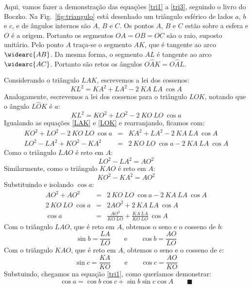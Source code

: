 Aqui, vamos fazer a demonstração das equações \ref{tri1} a \ref{tri3}, seguindo o livro do Boczko. Na Fig.~\ref{fig:triangulo} está desenhado um triângulo esférico de lados $a$, $b$ e $c$, e de ângulos internos são $A$, $B$ e $C$. Os pontos $A$, $B$ e $C$ estão sobre a esfera e $O$ é a origem. Portanto os segmentos $OA=OB=OC$ são o raio, suposto unitário. Pelo ponto $A$ traça-se o segmento $AK$, que é tangente ao arco $\widearc{AB}$. Da mesma forma, o segmento $AL$ é tangente ao arco $\widearc{AC}$. Portanto são retos os ângulos $O\hat{A}K=O\hat{A}L$.

Considerando o triângulo $LAK$, escrevemos a lei dos cossenos:
%
\begin{equation}
KL^2 = KA^2 + LA^2 - 2~KA~LA~\cos A \label{LAK}
\end{equation}
%
Analogamente, escrevemos a lei dos cossenos para o triângulo $LOK$, notando que o ângulo $L\hat{O}K$ é $a$:
%
\begin{equation}
KL^2 = KO^2 + LO^2 - 2~KO~LO~\cos a \label{LOK}
\end{equation}
%
Igualando as equações \ref{LAK} e \ref{LOK} e rearranjando, ficamos com:
%
\begin{eqnarray}
KO^2 + LO^2 - 2~KO~LO~\cos a &=& KA^2 + LA^2 - 2~KA~LA~\cos A \\
LO^2 - LA^2 + KO^2 - KA^2 &=& 2~KO~LO~\cos a - 2~KA~LA~\cos A
\end{eqnarray}
%
Como o triângulo $LAO$ é reto em $A$:
%
\begin{equation}
LO^2 - LA^2 = AO^2
\end{equation}
%
Similarmente, como o triângulo $KAO$ é reto em $A$:
%
\begin{equation}
KO^2 - KA^2 = AO^2
\end{equation}
%
Substituindo e isolando $\cos a$:
%
\begin{eqnarray}
AO^2 + AO^2 &=& 2~KO~LO~\cos a - 2~KA~LA~\cos A \\
2~KO~LO~\cos a &=& 2 AO^2 + 2~KA~LA~\cos A \\
\cos a &=& \frac{AO^2}{KO~LO} + \frac{KA~LA}{KO~LO}~\cos A
\end{eqnarray}
%
Com o triângulo $LAO$, que é reto em $A$, obtemos o seno e o cosseno de $b$:
%
\begin{equation}
\sin b = \frac{LA}{LO} \qquad \text{e} \qquad \cos b = \frac{AO}{LO}
\end{equation}
%
Com o triângulo $KAO$, que é reto em $A$, obtemos o seno e o cosseno de $c$:
%
\begin{equation}
\sin c = \frac{KA}{KO} \qquad \text{e} \qquad \cos c = \frac{AO}{KO}
\end{equation}
%
Substuindo, chegamos na equação \ref{tri1}, como queríamos demonstrar:
\[
\cos a = \cos b \cos c + \sin b \sin c \cos A \qquad \blacksquare
\]

